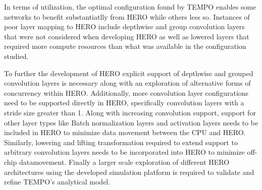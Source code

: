 In terms of utilization, the optimal configuration found by TEMPO enables some
networks to benefit substantiatlly from HERO while others less so. Instances of
poor layer mapping to HERO include depthwise and group convolution layers that
were not considered when developing HERO as well as lowered layers that required more
compute resources than what was available in the configuration studied. 

To further the development of HERO explicit support of depthwise and grouped
convolution layers is necessary along with an exploration of alternative forms
of concurrency within HERO. Additionally, more convolution layer configurations
need to be supported directly in HERO, specifically convolution layers with a
stride size greater than 1. Along with increasing convolution support, support
for other layer types like Batch normalization layers and activation layers
needs to be included in HERO to minimize data movement between the CPU and HERO.
Similarly, lowering and lifting transformation required to extend support to
arbitrary convolution layers needs to be incorporated into HERO to minimize
off-chip datamovement. Finally a larger scale exploration of different HERO
architectures using the developed simulation platform is required to validate
and refine TEMPO's analytical model.

